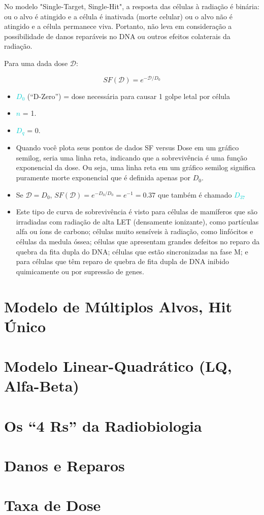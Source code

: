 \documentclass[11pt,a4paper]{article}
\newcounter{exemplo}
\begin{document}
	No modelo "Single-Target, Single-Hit", a resposta das células à radiação é binária: ou o alvo é atingido e a célula é inativada (morte celular) ou o alvo não é atingido e a célula permanece viva. Portanto, não leva em consideração a possibilidade de danos reparáveis no DNA ou outros efeitos colaterais da radiação.

	Para uma dada dose $\mathcal{D}$: 

	\begin{equation}
		SF(\mathcal{D}) = e^{-\mathcal{D}/D_0}
	\end{equation}

	\begin{exemplo}[onde:]
		\begin{itemize}
			\item \textcolor{DarkTurquoise}{\textbf{$D_0$}} (“D-Zero”) = dose necessária para causar 1 golpe letal por célula
			\item \textcolor{DarkTurquoise}{\textbf{$n$}} = 1.
			\item \textcolor{DarkTurquoise}{\textbf{$D_q$}} = 0.
			\item Quando você plota seus pontos de dados SF versus Dose em um gráfico semilog, seria uma linha reta, indicando que a sobrevivência é uma função exponencial da dose. Ou seja, uma linha reta em um gráfico semilog significa puramente morte exponencial que é definida apenas por $D_0$. 
			\item Se $\mathcal{D} = D_0$, $SF(\mathcal{D}) = e^{- D_0/D_0} = e^{-1} = 0.37$ que também é chamado \textcolor{DarkTurquoise}{\textbf{$D_{37}$}}
			\item Este tipo de curva de sobrevivência é visto para células de mamíferos que são irradiadas com radiação de alta LET (densamente ionizante), como partículas alfa ou íons de carbono; células muito sensíveis à radiação, como linfócitos e células da medula óssea; células que apresentam grandes defeitos no reparo da quebra da fita dupla do DNA; células que estão sincronizadas na fase M; e para células que têm reparo de quebra de fita dupla de DNA inibido quimicamente ou por supressão de genes.
		\end{itemize}
	\end{exemplo}

\section{Modelo de Múltiplos Alvos, Hit Único}

\section{Modelo Linear-Quadrático (LQ, Alfa-Beta)}

\section{Os “4 Rs” da Radiobiologia}

\section{Danos e Reparos}

\section{Taxa de Dose}




\end{document}
